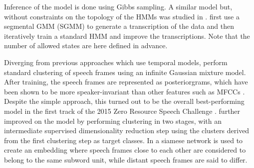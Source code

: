 Inference of the model is done using Gibbs sampling.
A similar model but, without constraints on the topology of the HMMs was studied in \parencite{gs:VanhainenAndSalvi2014ICASSP}.
\textcite{siu2014unsupervised} first use a segmental GMM (SGMM) to generate a transcription of the data and then iteratively train a standard HMM and improve the transcriptions. %
Note that the number of allowed states are here defined in advance.

Diverging from previous approaches which use temporal models, \textcite{chen2015parallel} perform standard clustering of speech frames using an infinite Gaussian mixture model.
After training, the speech frames are represented as posteriorgrams, which have been shown to be more speaker-invariant than other features such as MFCCs \parencite{zhang2010towards}.
Despite the simple approach, this turned out to be the overall best-performing model in the first track of the 2015 Zero Resource Speech Challenge \parencite{versteegh2016zero}.
\textcite{heck2016unsupervised} further improved on the model by performing clustering in two stages, with an intermediate supervised dimensionality reduction step using the clusters derived from the first clustering step as target classes.
In \parencite{synnaeve2016temporal} a siamese network \parencite{bromley1994signature} is used to create an embedding where speech frames close to each other are considered to belong to the same subword unit, while distant speech frames are said to differ.

